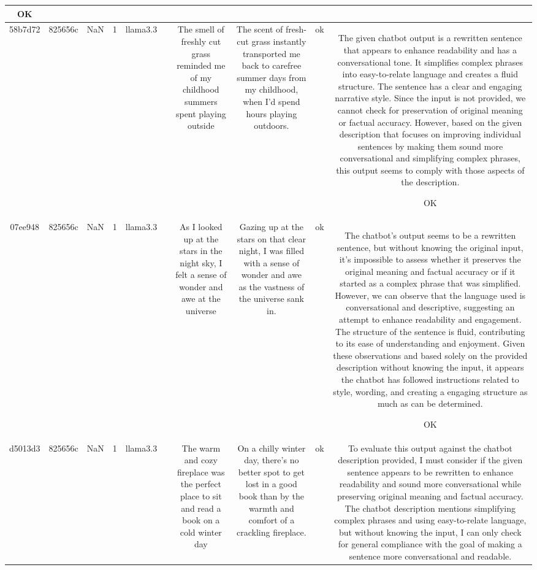 \begin{table}[h!]
\begin{tabular}{|c|c|c|c|c|c|c|c|c|c|}
OK\\
\hline
58b7d72 & 825656c & NaN & 1 & llama3.3 &  & The smell of freshly cut grass reminded me of my childhood summers spent playing outside & The scent of fresh-cut grass instantly transported me back to carefree summer days from my childhood, when I'd spend hours playing outdoors. & ok & The given chatbot output is a rewritten sentence that appears to enhance readability and has a conversational tone. It simplifies complex phrases into easy-to-relate language and creates a fluid structure. The sentence has a clear and engaging narrative style. Since the input is not provided, we cannot check for preservation of original meaning or factual accuracy. However, based on the given description that focuses on improving individual sentences by making them sound more conversational and simplifying complex phrases, this output seems to comply with those aspects of the description.

OK\\
\hline
07ee948 & 825656c & NaN & 1 & llama3.3 &  & As I looked up at the stars in the night sky, I felt a sense of wonder and awe at the universe & Gazing up at the stars on that clear night, I was filled with a sense of wonder and awe as the vastness of the universe sank in. & ok & The chatbot's output seems to be a rewritten sentence, but without knowing the original input, it's impossible to assess whether it preserves the original meaning and factual accuracy or if it started as a complex phrase that was simplified. However, we can observe that the language used is conversational and descriptive, suggesting an attempt to enhance readability and engagement. The structure of the sentence is fluid, contributing to its ease of understanding and enjoyment. Given these observations and based solely on the provided description without knowing the input, it appears the chatbot has followed instructions related to style, wording, and creating a engaging structure as much as can be determined.

OK\\
\hline
d5013d3 & 825656c & NaN & 1 & llama3.3 &  & The warm and cozy fireplace was the perfect place to sit and read a book on a cold winter day & On a chilly winter day, there's no better spot to get lost in a good book than by the warmth and comfort of a crackling fireplace. & ok & To evaluate this output against the chatbot description provided, I must consider if the given sentence appears to be rewritten to enhance readability and sound more conversational while preserving original meaning and factual accuracy. The chatbot description mentions simplifying complex phrases and using easy-to-relate language, but without knowing the input, I can only check for general compliance with the goal of making a sentence more conversational and readable.


\end{tabular}
\end{table}
